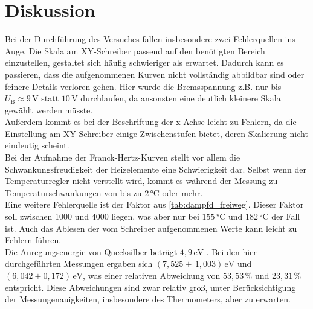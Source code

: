 \section{Diskussion}

Bei der Durchführung des Versuches fallen insbesondere zwei Fehlerquellen ins Auge.
Die Skala am XY-Schreiber passend auf den benötigten Bereich einzustellen, gestaltet sich häufig schwieriger als erwartet.
Dadurch kann es passieren, dass die aufgenommenen Kurven nicht vollständig abbildbar sind oder feinere Details verloren gehen.
Hier wurde die Bremsspannung z.B. nur bis $U_\text{B} \approx 9 \,\unit{\volt}$ statt $10 \,\unit{\volt}$ durchlaufen, da ansonsten eine
deutlich kleinere Skala gewählt werden müsste. \\
Außerdem kommt es bei der Beschriftung der x-Achse leicht zu Fehlern, da die Einstellung am XY-Schreiber einige Zwischenstufen bietet, deren Skalierung nicht eindeutig scheint. \\

Bei der Aufnahme der Franck-Hertz-Kurven stellt vor allem die Schwankungsfreudigkeit der Heizelemente eine Schwierigkeit dar.
Selbst wenn der Temperaturregler nicht verstellt wird, kommt es während der Messung zu Temperaturschwankungen von bis zu $2 \,\unit{\celsius}$ oder mehr. \\

Eine weitere Fehlerquelle ist der Faktor aus \autoref{tab:dampfd_freiweg}. Dieser Faktor soll zwischen 1000 und 4000 liegen, was aber nur bei $155 \, \unit{\celsius}$ und $182 \, \unit{\celsius}$ der Fall ist.
Auch das Ablesen der vom Schreiber aufgenommenen Werte kann leicht zu Fehlern führen. \\

Die Anregungsenergie von Quecksilber beträgt $4,9 \,\unit{\eV}$ \cite{ap09}. 
Bei den hier durchgeführten Messungen ergaben sich $\left(7,525 \pm \, 1,003\right) \, \unit{\electronvolt}$ 
und  $ \left(6,042 \pm 0,172 \right)\, \unit{\electronvolt}$, 
was einer relativen Abweichung von $53,53 \, \%$ und $23,31 \, \%$ entspricht.
Diese Abweichungen sind zwar relativ groß, unter Berücksichtigung der Messungenauigkeiten, 
insbesondere des Thermometers, aber zu erwarten.